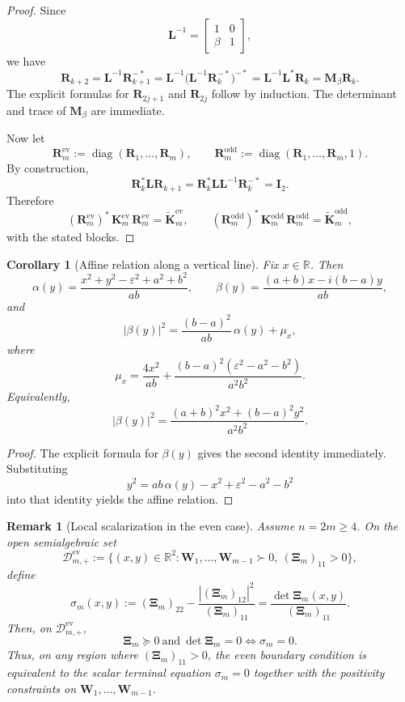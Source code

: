 \documentclass[11pt]{article}
\newtheorem{corollary}[theorem]{Corollary}
\newtheorem{remark}[theorem]{Remark}
\begin{document}
\begin{proof}
Since
\[
\mathbf{L}^{-1}=
\begin{bmatrix}
1&0\\
\beta&1
\end{bmatrix},
\]
we have
\[
\mathbf{R}_{k+2}
=
\mathbf{L}^{-1}\mathbf{R}_{k+1}^{-*}
=
\mathbf{L}^{-1}\bigl(\mathbf{L}^{-1}\mathbf{R}_k^{-*}\bigr)^{-*}
=
\mathbf{L}^{-1}\mathbf{L}^*\mathbf{R}_k
=
\mathbf{M}_\beta \mathbf{R}_k.
\]
The explicit formulas for \(\mathbf{R}_{2j+1}\) and \(\mathbf{R}_{2j}\) follow by induction. The determinant and trace of \(\mathbf{M}_\beta\) are immediate.

Now let
\[
\mathbf{R}_m^{\mathrm{ev}}:=\operatorname{diag}(\mathbf{R}_1,\dots,\mathbf{R}_m),
\qquad
\mathbf{R}_m^{\mathrm{odd}}:=\operatorname{diag}(\mathbf{R}_1,\dots,\mathbf{R}_m,1).
\]
By construction,
\[
\mathbf{R}_k^*\mathbf{L}\mathbf{R}_{k+1}
=
\mathbf{R}_k^*\mathbf{L}\mathbf{L}^{-1}\mathbf{R}_k^{-*}
=
\mathbf{I}_2.
\]
Therefore
\[
(\mathbf{R}_m^{\mathrm{ev}})^*\,\mathbf{K}_m^{\mathrm{ev}}\,\mathbf{R}_m^{\mathrm{ev}}
=
\widetilde{\mathbf{K}}_m^{\mathrm{ev}},
\qquad
(\mathbf{R}_m^{\mathrm{odd}})^*\,\mathbf{K}_m^{\mathrm{odd}}\,\mathbf{R}_m^{\mathrm{odd}}
=
\widetilde{\mathbf{K}}_m^{\mathrm{odd}},
\]
with the stated blocks.
\end{proof}

\begin{corollary}[Affine relation along a vertical line]\label{cor:alpha-beta-affine}
Fix \(x\in\mathbb{R}\). Then
\[
\alpha(y)=\frac{x^2+y^2-\varepsilon^2+a^2+b^2}{ab},
\qquad
\beta(y)=\frac{(a+b)x-i(b-a)y}{ab},
\]
and
\[
|\beta(y)|^2
=
\frac{(b-a)^2}{ab}\,\alpha(y)+\mu_x,
\]
where
\[
\mu_x
=
\frac{4x^2}{ab}
+
\frac{(b-a)^2(\varepsilon^2-a^2-b^2)}{a^2b^2}.
\]
Equivalently,
\[
|\beta(y)|^2
=
\frac{(a+b)^2x^2+(b-a)^2y^2}{a^2b^2}.
\]
\end{corollary}

\begin{proof}
The explicit formula for \(\beta(y)\) gives the second identity immediately. Substituting
\[
y^2=ab\,\alpha(y)-x^2+\varepsilon^2-a^2-b^2
\]
into that identity yields the affine relation.
\end{proof}

\begin{remark}[Local scalarization in the even case]\label{rem:local-scalarization-even}
Assume \(n=2m\ge 4\). On the open semialgebraic set
\[
\mathcal{D}_{m,+}^{\mathrm{ev}}
:=
\bigl\{(x,y)\in\mathbb{R}^2:
\mathbf{W}_1,\dots,\mathbf{W}_{m-1}\succ 0,
\ (\boldsymbol{\Xi}_m)_{11}>0
\bigr\},
\]
define
\[
\sigma_m(x,y)
:=
(\boldsymbol{\Xi}_m)_{22}
-
\frac{|(\boldsymbol{\Xi}_m)_{12}|^2}{(\boldsymbol{\Xi}_m)_{11}}
=
\frac{\det \boldsymbol{\Xi}_m(x,y)}{(\boldsymbol{\Xi}_m)_{11}}.
\]
Then, on \(\mathcal{D}_{m,+}^{\mathrm{ev}}\),
\[
\boldsymbol{\Xi}_m\succeq 0
\ \text{and}\
\det \boldsymbol{\Xi}_m=0
\iff
\sigma_m=0.
\]
Thus, on any region where \((\boldsymbol{\Xi}_m)_{11}>0\), the even boundary condition is equivalent to the scalar terminal equation \(\sigma_m=0\) together with the positivity constraints on \(\mathbf{W}_1,\dots,\mathbf{W}_{m-1}\).
\end{remark}
\end{document}

